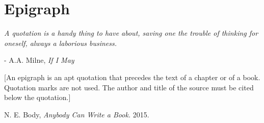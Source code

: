 \documentclass{ucalgarythesis}
\theoremstyle{plain}
\theoremstyle{definition}
\begin{document}
  \chapter{Epigraph}

  \begin{epiquote} 
   \textit{A quotation is a handy thing to have about, saving one the trouble of thinking for oneself, always a laborious business.} 
  \end{epiquote}    
  \begin{flushright} - A.A. Milne, \textit{If I May}\end{flushright}\bigskip
   
  [An epigraph is an apt quotation that precedes the text of a chapter or of a book. Quotation marks are not used. The author and title of the source must be cited below the quotation.]



  \mainmatter           %
    
  
    




  \begin{thebibliography}{9}

     N. E. Body, {\em Anybody Can Write a Book.}  2015.
    
  \end{thebibliography}
   
\end{document}
